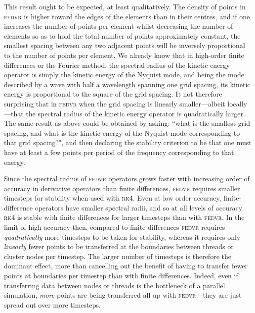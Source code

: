 This result ought to be expected, at least qualitatively. The density of points in \textsc{fedvr} is higher toward the edges of the elements than in their centres, and if one increases the number of points per element whilst decreasing the number of elements so as to hold the total number of points approximately constant, the smallest spacing between any two adjacent points will be inversely proportional to the number of points per element. We already know that in high-order finite differences or the Fourier method, the spectral radius of the kinetic energy operator is simply the kinetic energy of the Nyquist mode, and being the mode described by a wave with half a wavelength spanning one grid spacing, its kinetic energy is proportional to the square of the grid spacing. It not therefore surprising that in \textsc{fedvr} when the grid spacing is linearly smaller---albeit locally---that the spectral radius of the kinetic energy operator is quadratically larger. The same result as above could be obtained by asking: ``what is the smallest grid spacing, and what is the kinetic energy of the Nyquist mode corresponding to that grid spacing?", and then declaring the stability criterion to be that one must have at least a few points per period of the frequency corresponding to that energy.

Since the spectral radius of \textsc{fedvr} operators grows faster with increasing order of accuracy in derivative operators than finite differences, \textsc{fedvr} requires smaller timesteps for stability when used with \textsc{rk4}. Even at low order accuracy, finite-difference operators have smaller spectral radii, and so at all levels of accuracy \textsc{rk4} is stable with finite differences for larger timesteps than with \textsc{fedvr}. In the limit of high accuracy then, compared to finite differences \textsc{fedvr} requires \emph{quadratically} more timesteps to be taken for stability, whereas it requires only \emph{linearly} fewer points to be transferred at the boundaries between threads or cluster nodes per timestep. The larger number of timesteps is therefore the dominant effect, more than cancelling out the benefit of having to transfer fewer points at boundaries per timestep than with finite differences. Indeed, even if transferring data between nodes or threads is the bottleneck of a parallel simulation, \emph{more} points are being transferred all up with \textsc{fedvr}---they are just spread out over more timesteps.

